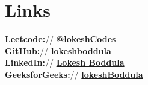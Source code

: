 \documentclass[]{deedy-resume-openfont}
\begin{document}
%
%

%
%

%
%

\begin{minipage}[t]{0.33\textwidth} 







\section{Links} 
{\bf Leetcode:}// \href{https://leetcode.com/lokeshCodes/} {\textbf{@lokeshCodes}} \\
{\bf GitHub:}// \href{https://github.com/lokeshboddula} {\textbf{lokeshboddula}} \\
{\bf LinkedIn:}// \href{https://www.linkedin.com/in/lokesh-boddula/}{ \textbf{ 
Lokesh Boddula}} \\
{ \bf GeeksforGeeks:}//  \href{https://auth.geeksforgeeks.org/user/lokesh_22/} {\textbf{lokeshBoddula}} \\



\end{minipage}
\end{document}
